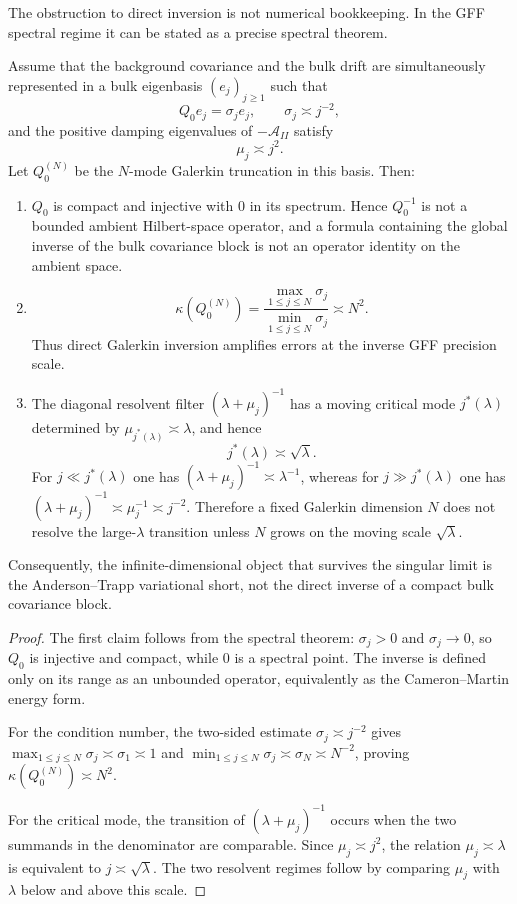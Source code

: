 The obstruction to direct inversion is not numerical bookkeeping.  In the GFF
spectral regime it can be stated as a precise spectral theorem.

\begin{lemma}
\label{lem:gff_spectral_obstruction_appendix}
Assume that the background covariance and the bulk drift are simultaneously
represented in a bulk eigenbasis $(e_j)_{j\ge1}$ such that
\[
  Q_0e_j=\sigma_je_j,
  \qquad
  \sigma_j\asymp j^{-2},
\]
and the positive damping eigenvalues of $-\mathcal{A}_{II}$ satisfy
\[
  \mu_j\asymp j^2 .
\]
Let $Q_0^{(N)}$ be the $N$-mode Galerkin truncation in this basis.  Then:
\begin{enumerate}[label=(\roman*)]
\item $Q_0$ is compact and injective with $0$ in its spectrum.  Hence
$Q_0^{-1}$ is not a bounded ambient Hilbert-space operator, and a formula
containing the global inverse of the bulk covariance block is not an operator
identity on the ambient space.
\item
\[
  \kappa(Q_0^{(N)})
  =
  \frac{\max_{1\le j\le N}\sigma_j}{\min_{1\le j\le N}\sigma_j}
  \asymp N^2 .
\]
Thus direct Galerkin inversion amplifies errors at the inverse GFF precision
scale.
\item The diagonal resolvent filter $(\lambda+\mu_j)^{-1}$ has a moving critical
mode $j^*(\lambda)$ determined by $\mu_{j^*(\lambda)}\asymp\lambda$, and hence
\[
  j^*(\lambda)\asymp\sqrt{\lambda}.
\]
For $j\ll j^*(\lambda)$ one has
$(\lambda+\mu_j)^{-1}\asymp\lambda^{-1}$, whereas for
$j\gg j^*(\lambda)$ one has
$(\lambda+\mu_j)^{-1}\asymp\mu_j^{-1}\asymp j^{-2}$.  Therefore a fixed
Galerkin dimension $N$ does not resolve the large-$\lambda$ transition unless
$N$ grows on the moving scale $\sqrt{\lambda}$.
\end{enumerate}
Consequently, the infinite-dimensional object that survives the singular limit
is the Anderson--Trapp variational short, not the direct inverse of a compact
bulk covariance block.
\end{lemma}

\begin{proof}
The first claim follows from the spectral theorem: $\sigma_j>0$ and
$\sigma_j\to0$, so $Q_0$ is injective and compact, while $0$ is a spectral point.
The inverse is defined only on its range as an unbounded operator, equivalently
as the Cameron--Martin energy form.

For the condition number, the two-sided estimate
$\sigma_j\asymp j^{-2}$ gives
$\max_{1\le j\le N}\sigma_j\asymp\sigma_1\asymp1$ and
$\min_{1\le j\le N}\sigma_j\asymp\sigma_N\asymp N^{-2}$, proving
$\kappa(Q_0^{(N)})\asymp N^2$.

For the critical mode, the transition of $(\lambda+\mu_j)^{-1}$ occurs when the
two summands in the denominator are comparable.  Since $\mu_j\asymp j^2$, the
relation $\mu_j\asymp\lambda$ is equivalent to $j\asymp\sqrt{\lambda}$.  The two
resolvent regimes follow by comparing $\mu_j$ with $\lambda$ below and above this
scale.
\end{proof}

